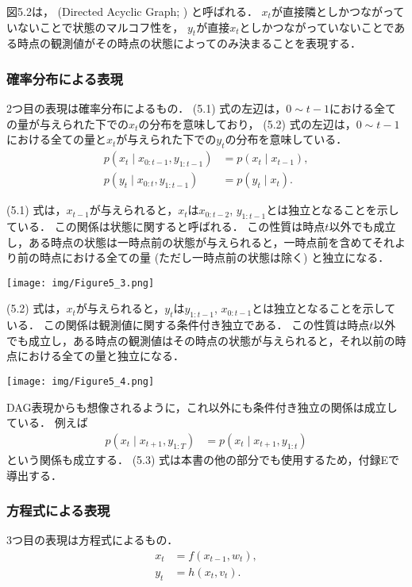 \documentclass[11pt,a4paper]{jsarticle}
\numberwithin{equation}{section}
\begin{document}
図5.2は， (Directed Acyclic Graph; ) と呼ばれる．
$x_t$が直接隣としかつながっていないことで状態のマルコフ性を，
$y_t$が直接$x_t$としかつながっていないことである時点の観測値がその時点の状態によってのみ決まることを表現する．

\subsubsection{確率分布による表現}
2つ目の表現は確率分布によるもの．
(5.1) 式の左辺は，$0 \sim t − 1$における全ての量が与えられた下での$x_t$の分布を意味しており，
(5.2) 式の左辺は，$0 \sim t − 1$における全ての量と$x_t$が与えられた下での$y_t$の分布を意味している．
\begin{align}
p(x_t \mid x_{0:t-1}, y_{1:t-1})
& =
p(x_t \mid x_{t-1}), \\
p(y_t \mid x_{0:t}, y_{1:t-1})
& =
p(y_t \mid x_t).
\end{align}

(5.1) 式は，$x_{t-1}$が与えられると，$x_t$は$x_{0:t-2}$, $y_{1:t-1}$とは独立となることを示している．
この関係は状態に関すると呼ばれる．
この性質は時点$t$以外でも成立し，ある時点の状態は一時点前の状態が与えられると，一時点前を含めてそれより前の時点における全ての量 (ただし一時点前の状態は除く) と独立になる．
\begin{center}
\texttt{[image: img/Figure5\_3.png]}
\end{center}

(5.2) 式は，$x_t$が与えられると，$y_t$は$y_{1:t-1}$, $x_{0:t-1}$とは独立となることを示している．
この関係は観測値に関する条件付き独立である．
この性質は時点$t$以外でも成立し，ある時点の観測値はその時点の状態が与えられると，それ以前の時点における全ての量と独立になる．
\begin{center}
\texttt{[image: img/Figure5\_4.png]}
\end{center}

DAG表現からも想像されるように，これ以外にも条件付き独立の関係は成立している．
例えば
\begin{align}
p(x_t \mid x_{t+1}, y_{1:T}) 
& =
p(x_t \mid x_{t+1}, y_{1:t})
\end{align}
という関係も成立する．
(5.3) 式は本書の他の部分でも使用するため，付録Eで導出する．

\subsubsection{方程式による表現}
3つ目の表現は方程式によるもの．
\begin{align}
x_t
& =
f(x_{t-1}, w_t), \\
y_t
& =
h(x_t, v_t).
\end{align}
\end{document}
